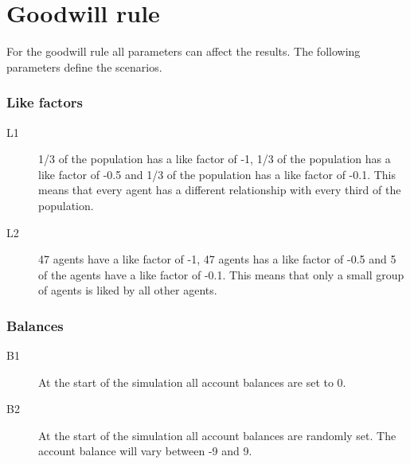 \documentclass[twoside,openright]{uva-bachelor-thesis}
\begin{document}
\section{Goodwill rule}
For the goodwill rule all parameters can affect the results. The following parameters define the scenarios.
\subsubsection{Like factors}
\begin{description}
\item[L1]	1/3 of the population has a like factor of -1, 1/3 of the population has a like factor of -0.5 and 1/3 of the population has a like factor of -0.1. This means that every agent has a different relationship with every third of the population.
\item[L2]	47 agents have a like factor of -1, 47 agents has a like factor of -0.5 and 5 of the agents have a like factor of -0.1. This means that only a small group of agents is liked by all other agents.
\end{description}
\subsubsection{Balances}
\begin{description}
\item[B1]	At the start of the simulation all account balances are set to 0.
\item[B2]	At the start of the simulation all account balances are randomly set. The account balance will vary between -9 and 9.
\end{description}
\end{document}
